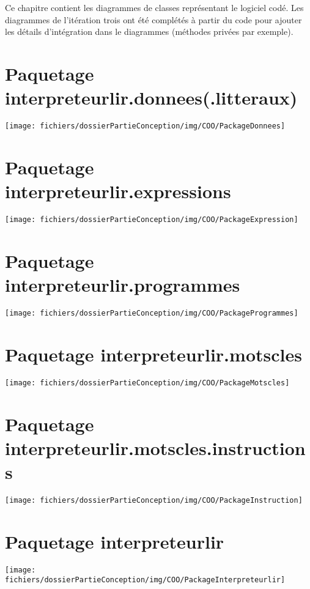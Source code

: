 \par Ce chapitre contient les diagrammes de classes représentant le logiciel codé. Les diagrammes de l'itération trois ont été complétés à partir du code pour ajouter les détails d'intégration dans le diagrammes (méthodes privées par exemple).

\section{Paquetage interpreteurlir.donnees(.litteraux)}
\begin{center}\texttt{[image: fichiers/dossierPartieConception/img/COO/PackageDonnees]}\end{center}

\section{Paquetage interpreteurlir.expressions}
\begin{center}\texttt{[image: fichiers/dossierPartieConception/img/COO/PackageExpression]}\end{center}

\section{Paquetage interpreteurlir.programmes}
\begin{center}\texttt{[image: fichiers/dossierPartieConception/img/COO/PackageProgrammes]}\end{center}

\section{Paquetage interpreteurlir.motscles}
\begin{center}\texttt{[image: fichiers/dossierPartieConception/img/COO/PackageMotscles]}\end{center}

\section{Paquetage interpreteurlir.motscles.instructions}
\begin{center}\texttt{[image: fichiers/dossierPartieConception/img/COO/PackageInstruction]}\end{center}

\section{Paquetage interpreteurlir}
\begin{center}\texttt{[image: fichiers/dossierPartieConception/img/COO/PackageInterpreteurlir]}\end{center}